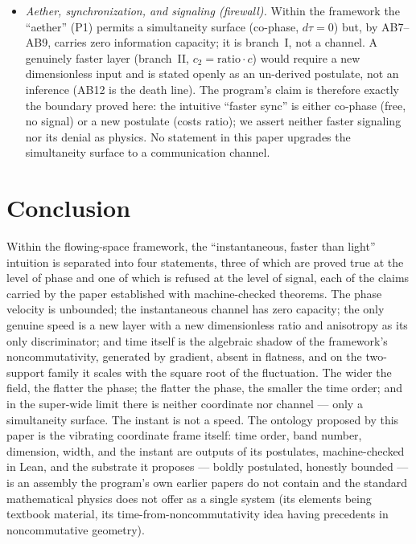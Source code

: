 \documentclass[aps,prd,preprint,superscriptaddress,amsmath,amssymb]{revtex4-2}
\begin{document}
\begin{itemize}
$k=0$ carries a time-varying resolvable symbol; branch~II dies if the
ratio is derivable from the postulates or if an observed ``fast
factor'' is neither drag nor ratio; the flatness reading dies if two
sink operators fail to commute on a flat field; the dimension cap
(the reading $\dim=\min(\#\text{bands},\,d+1)$) dies if, in any
concrete model, the phase rank fails to match the physical dimension
under the identification $v_i:=c_i$ --- the rank bound itself is a
theorem in any dimension (rank $\le d+1$ in $d+1$ dimensions), so
the death line sits in the identification layer, which a concrete
model can falsify, not in the rank theorem.
\item \emph{Aether, synchronization, and signaling (firewall).}  Within the
framework the ``aether'' (P1) permits a simultaneity surface
(co-phase, $d\tau=0$) but, by AB7--AB9, carries zero information
capacity; it is branch~I, not a channel.  A genuinely faster layer
(branch~II, $c_2=\mathrm{ratio}\cdot c$) would require a new dimensionless
input and is stated openly as an un-derived postulate, not an inference (AB12
is the death line).  The program's claim is therefore exactly the boundary
proved here: the intuitive ``faster sync'' is either co-phase (free, no
signal) or a new postulate (costs $\mathrm{ratio}$); we assert neither faster
signaling nor its denial as physics.  No statement in this paper upgrades the
simultaneity surface to a communication channel.
\end{itemize}

\section{Conclusion}
\label{sec:conclusion}

Within the flowing-space framework, the ``instantaneous, faster than
light'' intuition is separated into four statements, three of which
are proved true at the level of phase and one of which is refused at
the level of signal, each of the claims carried by the paper
established with machine-checked theorems.  The phase velocity is
unbounded; the
instantaneous channel has zero capacity; the only genuine speed is a
new layer with a new dimensionless ratio and anisotropy as its only
discriminator; and time itself is the algebraic shadow of the
framework's noncommutativity, generated by gradient, absent in
flatness, and on the two-support family it scales with the square
root of the fluctuation.
The wider the field, the flatter the phase; the flatter the phase, the
smaller the time order; and in the super-wide limit there is neither
coordinate nor channel --- only a simultaneity surface.  The instant
is not a speed.  The ontology proposed by this paper is the vibrating
coordinate frame itself: time order, band number, dimension, width,
and the instant are outputs of its postulates, machine-checked in
Lean, and the substrate it proposes --- boldly postulated, honestly
bounded --- is an assembly the program's own earlier papers do not
contain and the standard mathematical physics does not offer as a
single system (its elements being textbook material, its
time-from-noncommutativity idea having precedents in noncommutative
geometry).
\end{document}
